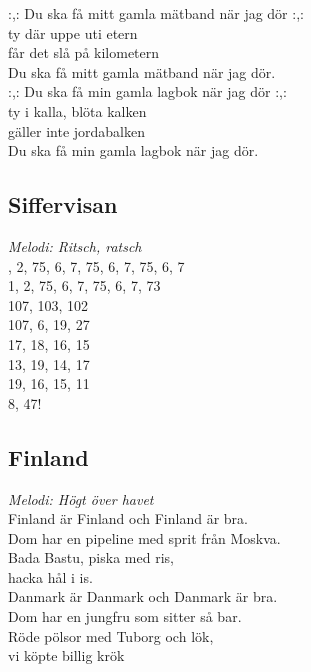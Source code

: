 \documentclass[a5paper]{article}
\begin{document}
\noindent
:,: Du ska få mitt gamla mätband när jag dör :,: \\
ty där uppe uti etern \\
får det slå på kilometern \\
Du ska få mitt gamla mätband när jag dör. \\

\noindent
:,: Du ska få min gamla lagbok när jag dör :,: \\
ty i kalla, blöta kalken \\
gäller inte jordabalken \\
Du ska få min gamla lagbok när jag dör. \\

\subsection{Siffervisan}
\textit{Melodi: Ritsch, ratsch} \\
	
, 2, 75, 6, 7, 75, 6, 7, 75, 6, 7 \\
1, 2, 75, 6, 7, 75, 6, 7, 73 \\
107, 103, 102 \\
107, 6, 19, 27 \\
17, 18, 16, 15 \\
13, 19, 14, 17 \\
19, 16, 15, 11 \\
8, 47! \\

\newpage

\subsection{Finland}
\textit{Melodi: Högt över havet} \\

\noindent 
Finland är Finland och Finland är bra. \\
Dom har en pipeline med sprit från Moskva. \\
Bada Bastu, piska med ris, \\
hacka hål i is. \\

\noindent 
Danmark är Danmark och Danmark är bra. \\
Dom har en jungfru som sitter så bar. \\
Röde pölsor med Tuborg och lök, \\
vi köpte billig krök \\
\end{document}
